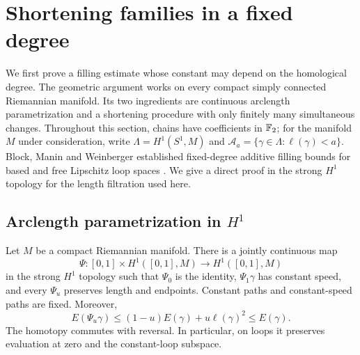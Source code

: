 \section{Shortening families in a fixed degree}\label{sec:shortening}

We first prove a filling estimate whose constant may depend on the homological
degree.  The geometric argument works on every compact simply connected
Riemannian manifold.  Its two ingredients are continuous arclength
parametrization and a shortening procedure with only finitely many simultaneous
changes.  Throughout this section, chains have coefficients in $\mathbb F_2$;
for the manifold $M$ under consideration, write
$\Lambda=H^1(S^1,M)$ and $\mathcal A_a=\{\gamma\in\Lambda:\ell(\gamma)<a\}$.
Block, Manin and Weinberger established fixed-degree additive filling
bounds for based and free Lipschitz loop spaces
\cite[Theorem~5.1]{BlockManinWeinberger2025}. We give a direct proof in
the strong $H^1$ topology for the length filtration used here.

\subsection{Arclength parametrization in \texorpdfstring{$H^1$}{H1}}

\begin{lemma}\label{lem:arclength}
Let $M$ be a compact Riemannian manifold.  There is a jointly continuous map
\[
 \Psi:[0,1]\times H^1([0,1],M)\longrightarrow H^1([0,1],M)
\]
in the strong $H^1$ topology such that $\Psi_0$ is the identity,
$\Psi_1\gamma$ has constant speed, and every $\Psi_u$ preserves length and
endpoints.  Constant paths and constant-speed paths are fixed.  Moreover,
\begin{equation}\label{eq:shortening-energy}
 E(\Psi_u\gamma)
 \le (1-u)E(\gamma)+u\ell(\gamma)^2
 \le E(\gamma).
\end{equation}
The homotopy commutes with reversal.  In particular, on loops it preserves
evaluation at zero and the constant-loop subspace.
\end{lemma}

